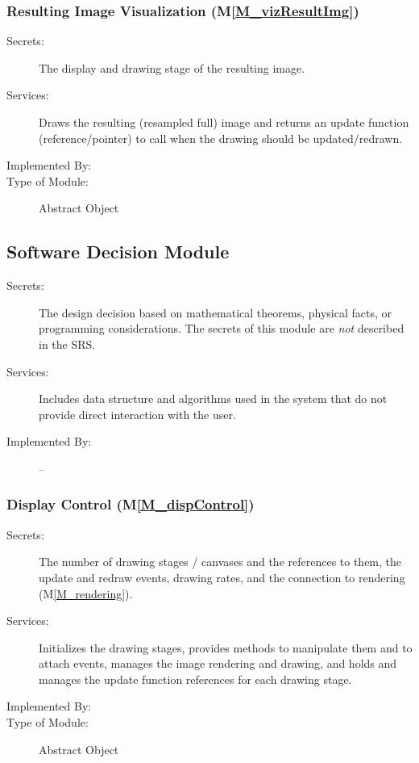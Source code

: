 \documentclass[12pt, titlepage]{article}
\newcommand{\mref}[1]{M\ref{#1}}
\begin{document}
\subsubsection{Resulting Image Visualization (\mref{M_vizResultImg})}
\begin{description}
\item[Secrets:] The display and drawing stage 
of the resulting image.
\item[Services:] Draws the resulting (resampled full) image 
  and returns an update function (reference/pointer) to call when the drawing
  should be updated/redrawn.
\item[Implemented By:] \progname{}
\item[Type of Module:] Abstract Object
\end{description}



\subsection{Software Decision Module}

\begin{description}
\item[Secrets:] The design decision based on mathematical theorems, physical
  facts, or programming considerations. The secrets of this module are
  \emph{not} described in the SRS.
\item[Services:] Includes data structure and algorithms used in the system that
  do not provide direct interaction with the user. 
\item[Implemented By:] --
\end{description}


\subsubsection{Display Control (\mref{M_dispControl})}
\begin{description}
\item[Secrets:] The number of drawing stages / canvases and the references to them,
  the update and redraw events, drawing rates,
  and the connection to rendering (\mref{M_rendering}).
\item[Services:] Initializes the drawing stages, provides methods to manipulate them
  and to attach events, manages the image rendering and drawing, and
  holds and manages the update function references for each drawing stage.
\item[Implemented By:] \progname{}
\item[Type of Module:] Abstract Object
\end{description}
\end{document}

